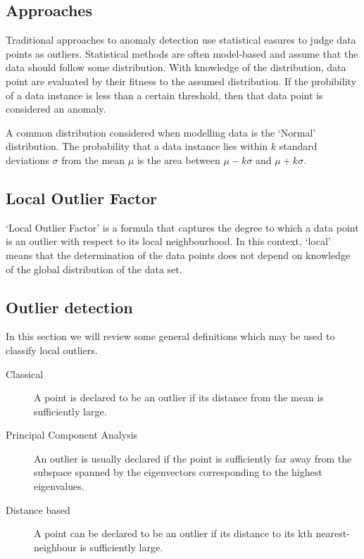 \subsection{Approaches}
Traditional approaches to anomaly detection use statistical easures to judge 
data points as outliers. Statistical methods are often model-based and assume 
that the data should follow some distribution. With knowledge of the 
distribution, data point are evaluated by their fitness to the assumed 
distribution. If the probibility of a data instance is less than a certain 
threshold, then that data point is considered an anomaly.

A common distribution considered when modelling data is the `Normal' 
distribution. The probability that a data instance lies within $k$ standard 
deviations $\sigma$ from the mean $\mu$ is the area between $\mu - k\sigma$ and 
$\mu + k\sigma$.

\subsection{Local Outlier Factor}
\label{sec:localOutlierFactor}
`Local Outlier Factor' is a formula that captures the degree to which a data 
point is an outlier with respect to its local neighbourhood. In this context,
`local' means that the determination of the data points does not depend on 
knowledge of the global distribution of the data set.

\subsection{Outlier detection}
\label{sec:outlierDetection}
In this section we will review some general definitions which may be used to 
classify local outliers.

\begin{description}

\item[Classical] A point is declared to be an outlier if its distance from the 
mean is sufficiently large.
\item[Principal Component Analysis] An outlier is usually declared if the point 
is sufficiently far away from the subspace spanned by the eigenvectors 
corresponding to the highest eigenvalues.
\item[Distance based] A point can be declared to be an outlier if its distance 
to its kth nearest-neighbour is sufficiently large.

\end{description}

